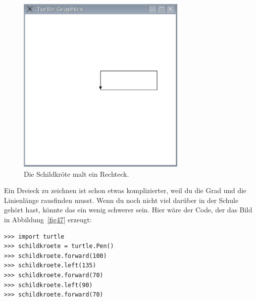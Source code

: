\begin{figure}
\begin{center}
\includegraphics[width=82mm]{images/figure46}
\end{center}
\caption{Die Schildkröte malt ein Rechteck.}\label{fig46}
\end{figure}

\noindent
Ein Dreieck zu zeichnen ist schon etwas komplizierter, weil du die Grad und die Linienlänge rausfinden musst. Wenn du noch nicht viel darüber in der Schule gehört hast, könnte das ein wenig schwerer sein. Hier wäre der Code, der das Bild in Abbildung~\ref{fig47} erzeugt:

\begin{Verbatim}[frame=single]
>>> import turtle
>>> schildkroete = turtle.Pen()
>>> schildkroete.forward(100)
>>> schildkroete.left(135)
>>> schildkroete.forward(70)
>>> schildkroete.left(90)
>>> schildkroete.forward(70)
\end{Verbatim}

